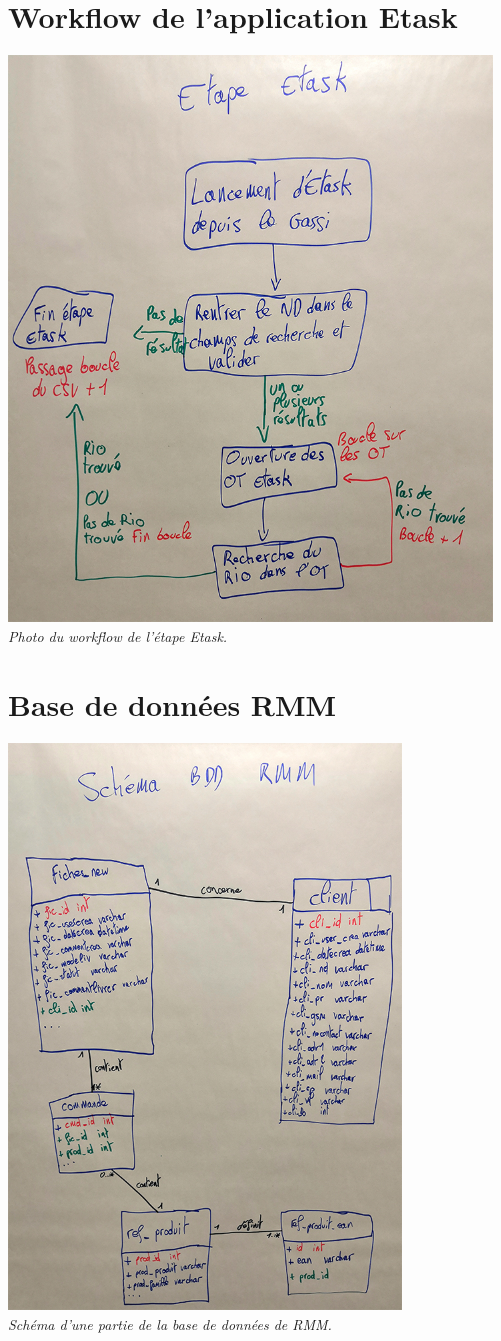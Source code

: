 \documentclass[a4paper,twoside,12pt]{report}
\begin{document}
\chapter{Workflow de l'application Etask}
\begin{center}
\includegraphics[height=15cm]{workflowEtask.jpg}\\
\itshape Photo du workflow de l'étape Etask.
\end{center}
\chapter{Base de données RMM}
\begin{center}
\includegraphics[height=15cm]{schemaBDD_RMM.jpg}\\
\itshape Schéma d'une partie de la base de données de RMM.
\end{center}
\end{document}
